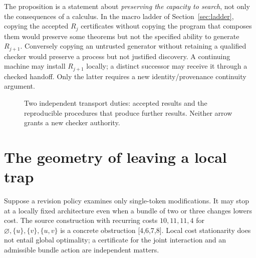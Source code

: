 \documentclass[11pt,letterpaper]{article}
\theoremstyle{definition}
\theoremstyle{remark}
\newcommand{\src}[1]{\textup{[#1]}}
\begin{document}
The proposition is a statement about \emph{preserving the capacity to search}, not only the consequences of a calculus. In the macro ladder of Section~\ref{sec:ladder}, copying the accepted $R_j$ certificates without copying the program that composes them would preserve some theorems but not the specified ability to generate $R_{j+1}$. Conversely copying an untrusted generator without retaining a qualified checker would preserve a process but not justified discovery. A continuing machine may install $R_{j+1}$ locally; a distinct successor may receive it through a checked handoff. Only the latter requires a new identity/provenance continuity argument.

\begin{figure}[htbp]\centering
{}
\caption{Two independent transport duties: accepted results and the reproducible procedures that produce further results. Neither arrow grants a new checker authority.}
\end{figure}


\section{The geometry of leaving a local trap}
Suppose a revision policy examines only single-token modifications. It may stop at a locally fixed architecture even when a bundle of two or three changes lowers cost. The source construction with recurring costs $10,11,11,4$ for $\varnothing,\{u\},\{v\},\{u,v\}$ is a concrete obstruction \src{4,6,7,8}. Local cost stationarity does not entail global optimality; a certificate for the joint interaction and an admissible bundle action are independent matters.
\end{document}
